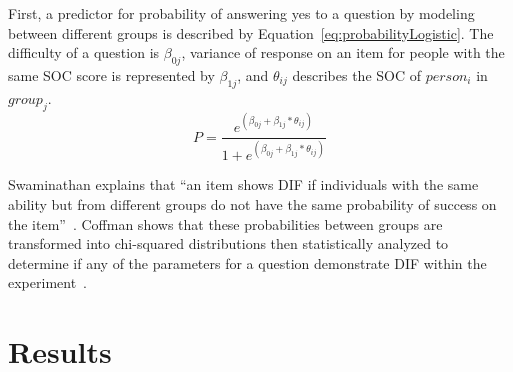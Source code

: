 \documentclass{sig-alternate}
\begin{document}
First, a predictor for probability of answering yes to a question by modeling between different groups is described by Equation~\ref{eq:probabilityLogistic}. The difficulty of a question is $\beta_{0j}$, variance of response on an item for people with the same SOC score is represented by $\beta_{1j}$, and $\theta_{ij}$ describes the SOC of $person_i$ in $group_j$.
\begin{equation}
\label{eq:probabilityLogistic}
P =  \frac{e^{(\beta_{0j} + \beta_{1j}*\theta_{ij})}}{1+e^{(\beta_{0j} + \beta_{1j}*\theta_{ij})}} 
\end{equation}

Swaminathan explains that ``an item shows DIF if individuals with the same ability but from different groups do not have the same probability of success on the item''~\cite{logisticDIF:1990}.
Coffman shows that these probabilities between groups are transformed into chi-squared distributions then statistically analyzed to determine if any of the parameters for a question demonstrate DIF within the experiment~\cite{disparities:2009}.



\section{Results}
\label{sec:results}
\end{document}
